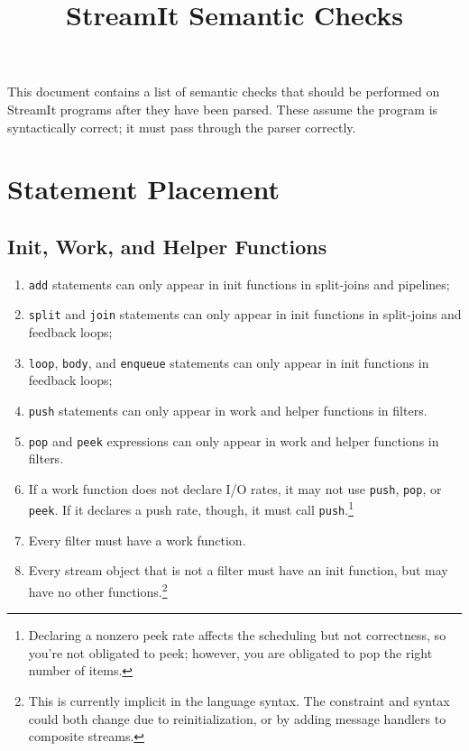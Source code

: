 \documentclass[11pt]{article}
\title{StreamIt Semantic Checks}
\begin{document}
\maketitle

This document contains a list of semantic checks that should be
performed on StreamIt programs after they have been parsed.  These
assume the program is syntactically correct; it must pass through the
parser correctly.

\section{Statement Placement}

\subsection{Init, Work, and Helper Functions}

\begin{enumerate}
\item \lstinline|add| statements can only appear in init functions in
  split-joins and pipelines;
\item \lstinline|split| and \lstinline|join| statements can only
  appear in init functions in split-joins and feedback loops;
\item \lstinline|loop|, \lstinline|body|, and \lstinline|enqueue|
  statements can only appear in init functions in feedback loops;
\item \lstinline|push| statements can only appear in work and helper
  functions in filters.
\item \lstinline|pop| and \lstinline|peek| expressions can only appear
  in work and helper functions in filters.
\item If a work function does not declare I/O rates, it may not use
  \lstinline|push|, \lstinline|pop|, or \lstinline|peek|.  If it
  declares a push rate, though, it must call
  \lstinline|push|.\footnote{Declaring a nonzero peek rate affects the
    scheduling but not correctness, so you're not obligated to peek;
    however, you are obligated to pop the right number of items.}
\item Every filter must have a work function.
\item Every stream object that is not a filter must have an init
  function, but may have no other functions.\footnote{This is
    currently implicit in the language syntax.  The constraint and
    syntax could both change due to reinitialization, or by adding
    message handlers to composite streams.}
\end{enumerate}
\end{document}
